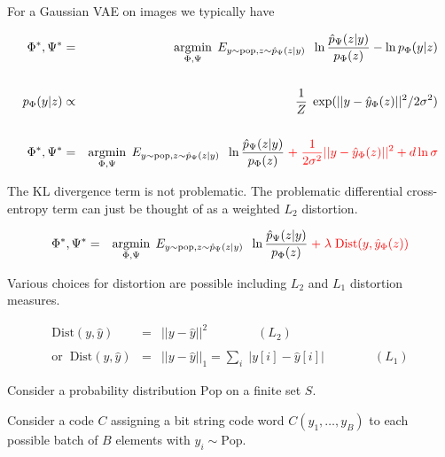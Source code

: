 {

For a Gaussian VAE on images we typically have

{\huge
\begin{eqnarray*}
\Phi^*, \Psi^* & = & \operatorname*{argmin}_{\Phi,\Psi}\; E_{y\sim\mathrm{pop},z \sim \hat{p}_\Psi(z|y)}\;\; \ln \frac{ \hat{p}_\Psi(z|y)}{p_\Phi(z)}  - \ln p_\Phi(y|z)\\
\\
p_\Phi(y|z) & \propto & \frac{1}{Z}\;\exp(||y-\hat{y}_\Phi(z)||^2/2\sigma^2) \\
\\
\Phi^*, \Psi^* & = & \operatorname*{argmin}_{\Phi,\Psi}\; E_{y\sim\mathrm{pop},z \sim \hat{p}_\Psi(z|y)}\;\; \ln \frac{ \hat{p}_\Psi(z|y)}{p_\Phi(z)}  \;{\color{red} +\; \frac{1}{2\sigma^2}||y-\hat{y}_\Phi(z)||^2 + d\ln \sigma}
\end{eqnarray*}
}

The KL divergence term is not problematic. The problematic differential cross-entropy term can just be thought of as a weighted $L_2$ distortion.



{\huge
\begin{eqnarray*}
\Phi^*, \Psi^* & = & \operatorname*{argmin}_{\Phi,\Psi}\; E_{y\sim\mathrm{pop},z \sim \hat{p}_\Psi(z|y)}\;\; \ln \frac{ \hat{p}_\Psi(z|y)}{p_\Phi(z)}  \;{\color{red} +\; \lambda\;\mathrm{Dist}(y,\hat{y}_\Phi(z))}
\end{eqnarray*}
}

\vfill
Various choices for distortion are possible including $L_2$ and $L_1$ distortion measures.

\begin{eqnarray*}
\mathrm{Dist}(y,\hat{y}) & = & ||y-\hat{y}||^2 \hspace{4em}(L_2) \\
\\
\mathrm{or}\;\;\mathrm{Dist}(y,\hat{y}) & = & ||y-\hat{y}||_1 = \sum_i \;|y[i] - \hat{y}[i]| \hspace{4em}(L_1)
\end{eqnarray*}



}



Consider a probability distribution $\mathrm{Pop}$ on a finite set $S$.

\vfill
Consider a code $C$ assigning a bit string code word $C(y_1,\ldots,y_B)$ to each possible batch of $B$ elements with $y_i \sim \mathrm{Pop}$.

